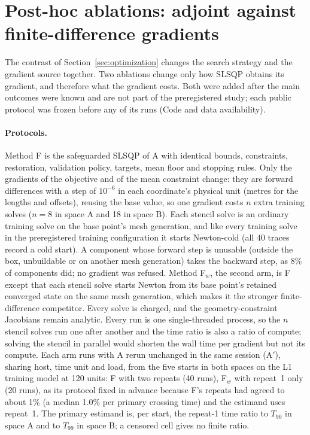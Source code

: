 \section{Post-hoc ablations: adjoint against finite-difference gradients}\label{sec:exp2-fd}
The contrast of Section~\ref{sec:optimization} changes the search strategy
and the gradient source together. Two ablations change only how SLSQP
obtains its gradient, and therefore what the gradient costs. Both were
added after the main outcomes were known and are not part of the
preregistered study; each public protocol was frozen before any of its
runs (Code and data availability).

\paragraph{Protocols.}
Method F is the safeguarded SLSQP of A with identical bounds, constraints,
restoration, validation policy, targets, mean floor and stopping rules.
Only the gradients of the objective and of the mean constraint change: they
are forward differences with a step of $10^{-6}$ in each coordinate's
physical unit (metres for the lengths and offsets), reusing the base value,
so one gradient costs $n$ extra training solves ($n=8$ in space A and 18 in
space B). Each stencil solve is an ordinary training solve on the base
point's mesh generation, and like every training solve in the
preregistered training configuration it starts Newton-cold (all 40 traces
record a cold start). A component whose forward step is unusable
(outside the box, unbuildable or on another mesh generation) takes the
backward step, as 8\% of components did; no gradient was refused. Method
F$_w$, the second arm, is F except that each stencil solve starts Newton
from its base point's retained converged state on the same mesh generation,
which makes it the stronger finite-difference competitor. Every solve is
charged, and the geometry-constraint Jacobians remain analytic. Every run is
one single-threaded process, so the $n$ stencil solves run one after
another and the time ratio is also a ratio of compute; solving the stencil
in parallel would shorten the wall time per gradient but not its compute.
Each arm runs with A rerun unchanged in the same session (A$'$), sharing
host, time unit and load, from the five starts in both spaces on the L1
training model at 120 units: F with two repeats (40 runs), F$_w$ with
repeat~1 only (20 runs), as its protocol fixed in advance because F's
repeats had agreed to about 1\% (a median 1.0\% per primary crossing time)
and the estimand uses repeat~1. The primary estimand is, per start, the repeat-1
time ratio to $T_{90}$ in space A and to $T_{99}$ in space B; a censored
cell gives no finite ratio.

